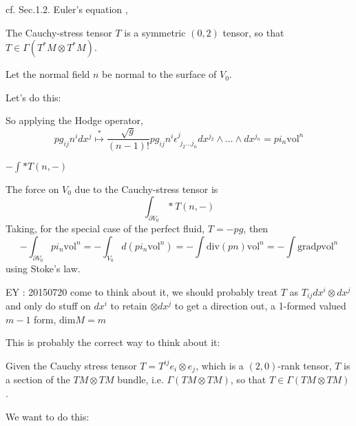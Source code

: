 \documentclass[twoside,landscape,10pt]{amsart}
\theoremstyle{plain}
\theoremstyle{definition}
\theoremstyle{remark}
\theoremstyle{remark}
\begin{document}
\begin{multicols*}{2}
cf. Sec.1.2. Euler's equation \cite{LLandauELifshitz1987}, 

The Cauchy-stress tensor $T$ is a symmetric $(0,2)$ tensor, so that $T \in \Gamma(T^*M \otimes T^*M)$.  

Let the normal field $n$ be normal to the surface of $V_0$.  

Let's do this:


So applying the Hodge operator, 
\[
pg_{ij} n^i dx^j \overset{*}{\mapsto} \frac{ \sqrt{g}}{(n-1)!} pg_{ij} n^i \epsilon^j_{ \,\, j_2 \dots j_n} dx^{j_2} \wedge \dots \wedge dx^{j_n} = pi_n \text{vol}^n
\]

$-\int * T(n,-)$

The force on $V_0$ due to the Cauchy-stress tensor is 
\[
\int_{\partial V_0} *T(n,-)
\]
Taking, for the special case of the perfect fluid, $T = - pg$, then 
\[
- \int_{\partial V_0} pi_n\text{vol}^n = -\int_{V_0} d(pi_n\text{vol}^n) = - \int \text{div}(pn) \text{vol}^n = -\int \text{grad}p \text{vol}^n
\]
using Stoke's law.  

EY : 20150720 come to think about it, we should probably treat $T$ as $T_{ij} dx^i \otimes dx^j$ and only do stuff on $dx^i$ to retain $\otimes dx^j$ to get a direction out, a 1-formed valued $m-1$ form, $\text{dim}M=m$

This is probably the correct way to think about it:

Given the Cauchy stress tensor $T = T^{ij} e_i \otimes e_j$, which is a $(2,0)$-rank tensor, $T$ is a section of the $TM\otimes TM$ bundle, i.e. $\Gamma(TM \otimes TM)$, so that $T \in \Gamma(TM \otimes TM)$.  

We want to do this:



\end{multicols*}
\end{document}
